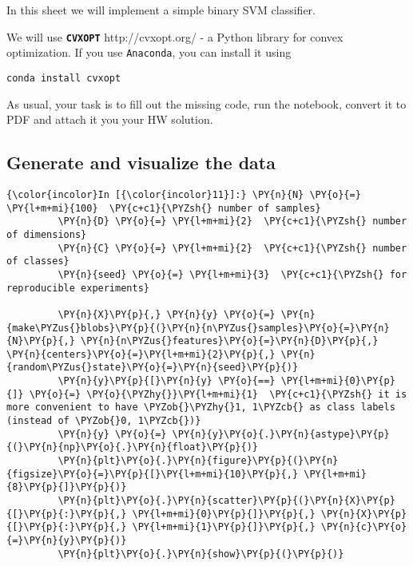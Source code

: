     In this sheet we will implement a simple binary SVM classifier.

We will use \textbf{\texttt{CVXOPT}} http://cvxopt.org/ - a Python
library for convex optimization. If you use \texttt{Anaconda}, you can
install it using

\begin{verbatim}
conda install cvxopt
\end{verbatim}

As usual, your task is to fill out the missing code, run the notebook,
convert it to PDF and attach it you your HW solution.

    \hypertarget{generate-and-visualize-the-data}{%
\subsection{Generate and visualize the
data}\label{generate-and-visualize-the-data}}

    \begin{Verbatim}[commandchars=\\\{\}]
{\color{incolor}In [{\color{incolor}11}]:} \PY{n}{N} \PY{o}{=} \PY{l+m+mi}{100}  \PY{c+c1}{\PYZsh{} number of samples}
         \PY{n}{D} \PY{o}{=} \PY{l+m+mi}{2}  \PY{c+c1}{\PYZsh{} number of dimensions}
         \PY{n}{C} \PY{o}{=} \PY{l+m+mi}{2}  \PY{c+c1}{\PYZsh{} number of classes}
         \PY{n}{seed} \PY{o}{=} \PY{l+m+mi}{3}  \PY{c+c1}{\PYZsh{} for reproducible experiments}
         
         \PY{n}{X}\PY{p}{,} \PY{n}{y} \PY{o}{=} \PY{n}{make\PYZus{}blobs}\PY{p}{(}\PY{n}{n\PYZus{}samples}\PY{o}{=}\PY{n}{N}\PY{p}{,} \PY{n}{n\PYZus{}features}\PY{o}{=}\PY{n}{D}\PY{p}{,} \PY{n}{centers}\PY{o}{=}\PY{l+m+mi}{2}\PY{p}{,} \PY{n}{random\PYZus{}state}\PY{o}{=}\PY{n}{seed}\PY{p}{)}
         \PY{n}{y}\PY{p}{[}\PY{n}{y} \PY{o}{==} \PY{l+m+mi}{0}\PY{p}{]} \PY{o}{=} \PY{o}{\PYZhy{}}\PY{l+m+mi}{1}  \PY{c+c1}{\PYZsh{} it is more convenient to have \PYZob{}\PYZhy{}1, 1\PYZcb{} as class labels (instead of \PYZob{}0, 1\PYZcb{})}
         \PY{n}{y} \PY{o}{=} \PY{n}{y}\PY{o}{.}\PY{n}{astype}\PY{p}{(}\PY{n}{np}\PY{o}{.}\PY{n}{float}\PY{p}{)}
         \PY{n}{plt}\PY{o}{.}\PY{n}{figure}\PY{p}{(}\PY{n}{figsize}\PY{o}{=}\PY{p}{[}\PY{l+m+mi}{10}\PY{p}{,} \PY{l+m+mi}{8}\PY{p}{]}\PY{p}{)}
         \PY{n}{plt}\PY{o}{.}\PY{n}{scatter}\PY{p}{(}\PY{n}{X}\PY{p}{[}\PY{p}{:}\PY{p}{,} \PY{l+m+mi}{0}\PY{p}{]}\PY{p}{,} \PY{n}{X}\PY{p}{[}\PY{p}{:}\PY{p}{,} \PY{l+m+mi}{1}\PY{p}{]}\PY{p}{,} \PY{n}{c}\PY{o}{=}\PY{n}{y}\PY{p}{)}
         \PY{n}{plt}\PY{o}{.}\PY{n}{show}\PY{p}{(}\PY{p}{)}
\end{Verbatim}


